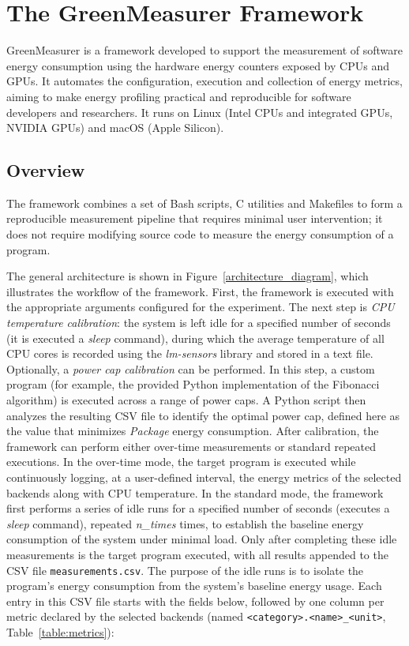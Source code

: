 \section{The GreenMeasurer Framework}
\label{sec:greenmeasurer}

GreenMeasurer is a framework developed to support the measurement of software energy consumption using the hardware energy counters exposed by CPUs and GPUs. It automates the configuration, execution and collection of energy metrics, aiming to make energy profiling practical and reproducible for software developers and researchers. It runs on Linux (Intel CPUs and integrated GPUs, NVIDIA GPUs) and macOS (Apple Silicon).

\subsection{Overview}

The framework combines a set of Bash scripts, C utilities and Makefiles to form a reproducible measurement pipeline that requires minimal user intervention; it does not require modifying source code to measure the energy consumption of a program.

The general architecture is shown in Figure~\ref{architecture_diagram}, which illustrates the workflow of the framework. First, the framework is executed with the appropriate arguments configured for the experiment. The next step is \textit{CPU temperature calibration}: the system is left idle for a specified number of seconds (it is executed a \textit{sleep} command), during which the average temperature of all CPU cores is recorded using the \textit{lm-sensors} library \cite{lm-sensors} and stored in a text file. Optionally, a \textit{power cap calibration} can be performed. In this step, a custom program (for example, the provided Python implementation of the Fibonacci algorithm) is executed across a range of power caps. A Python script then analyzes the resulting CSV file to identify the optimal power cap, defined here as the value that minimizes \textit{Package} energy consumption. After calibration, the framework can perform either over-time measurements or standard repeated executions. In the over-time mode, the target program is executed while continuously logging, at a user-defined interval, the energy metrics of the selected backends along with CPU temperature. In the standard mode, the framework first performs a series of idle runs for a specified number of seconds (executes a \textit{sleep} command), repeated \textit{n\_times} times, to establish the baseline energy consumption of the system under minimal load. Only after completing these idle measurements is the target program executed, with all results appended to the CSV file \texttt{measurements.csv}. The purpose of the idle runs is to isolate the program's energy consumption from the system's baseline energy usage. Each entry in this CSV file starts with the fields below, followed by one column per metric declared by the selected backends (named \texttt{<category>.<name>\_<unit>}, Table~\ref{table:metrics}):

